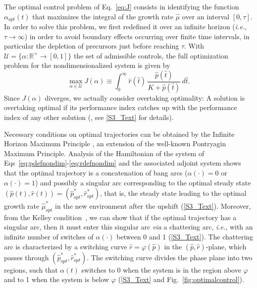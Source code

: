 The optimal control problem of Eq.~\ref{eq:J} consists in identifying the function $\alpha_{opt}(t)$ that maximizes the integral of the growth rate $\hat{\mu}$ over an interval $[0, \tau]$.
In order to solve this problem, we first redefined it over an infinite horizon (\textit{i.e.}, $\tau \rightarrow \infty $) in order to avoid boundary effects occurring over finite time intervals, in particular the depletion of precursors just before reaching $\tau$.
With $\mathcal{U}=\{\alpha:\mathbb{R}^+ \rightarrow [0,1] \}$ the set of admissible controls, the full optimization problem for the nondimensionalized system is given by
\begin{equation}\label{eq:meth_prob}
\max_{\alpha \in \mathcal{U}} J(\alpha)\equiv \int_0^{\infty} \hat{r}(\hat{t}) \, \dfrac{\hat{p}(\hat{t})}{K+\hat{p}(\hat{t})}\, d\hat{t}.
\end{equation}
Since $J(\alpha)$ diverges, we actually consider overtaking optimality:
A solution is overtaking optimal if its performance index catches up with the performance index of any other solution (\cite{carlson_infinite_1991}, see \ref{S3_Text} for details).

Necessary conditions on optimal trajectories can be obtained by the Infinite Horizon Maximum Principle \cite{carlson_infinite_1991}, an extension of the well-known Pontryagin Maximum Principle.
Analysis of the Hamiltonian of the system of Eqs~\ref{eq:pdefnondim}-\ref{eq:rdefnondim} and the associated adjoint system shows that the optimal trajectory is a concatenation of bang arcs ($\alpha(\cdot)=0$ or $\alpha(\cdot)=1$) and possibly a singular arc corresponding to the optimal steady state $(\hat{p}(t),\hat{r}(t))=(\hat{p}_{opt}^*,\hat{r}_{opt}^*)$, that is, the steady state leading to the optimal growth rate $\hat{\mu}_{opt}^*$ in the new environment after the upshift (\ref{S3_Text}).
Moreover, from the Kelley condition~\cite{borisov_fullers_2000}, we can show that if the optimal trajectory has a singular arc, then it must enter this singular arc \textit{via} a chattering arc, \textit{i.e.}, with an infinite number of switches of $\alpha (\cdot)$ between 0 and 1 (\ref{S3_Text}).
The chattering arc is characterized by a switching curve $\hat{r}=\varphi(\hat{p})$ in the $(\hat{p},\hat{r})$-plane, which passes through $(\hat{p}_{opt}^*,\hat{r}_{opt}^*)$.
The switching curve divides the phase plane into two regions, such that $\alpha(t)$ switches to 0 when the system is in the region above $\varphi$ and to 1 when the system is below $\varphi$ (\ref{S3_Text} and Fig.~\ref{fig:optimalcontrol}).

